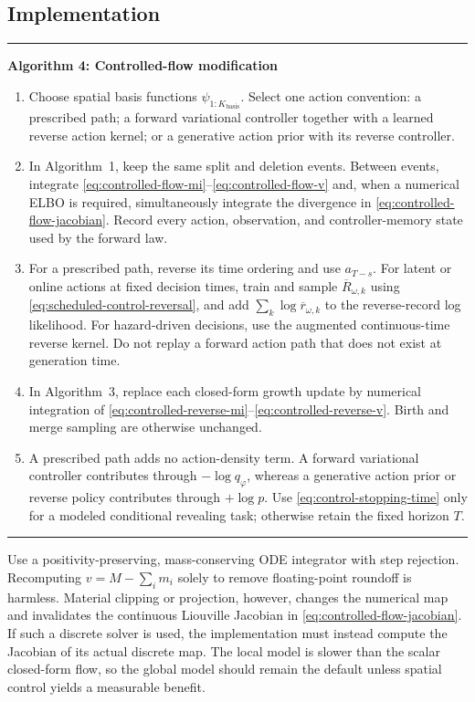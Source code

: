 \documentclass[10pt]{article}
\theoremstyle{definition}
\theoremstyle{remark}
\newenvironment{algorithmblock}[1]
{\par\medskip\noindent\begin{minipage}{\linewidth}\hrule\medskip
 \noindent\textbf{#1}\par\smallskip\small}
{\par\medskip\hrule\end{minipage}\par\medskip}
\begin{document}
\subsection{Implementation}

\begin{algorithmblock}{Algorithm 4: Controlled-flow modification}
\begin{enumerate}
  \item Choose spatial basis functions
  $\psi_{1:K_{\mathrm{basis}}}$.  Select one action convention: a prescribed
  path; a forward variational controller together with a learned reverse
  action kernel; or a generative action prior with its reverse controller.
  \item In Algorithm~1, keep the same split and deletion events.  Between
  events, integrate \eqref{eq:controlled-flow-mi}--\eqref{eq:controlled-flow-v}
  and, when a numerical ELBO is required, simultaneously integrate the
  divergence in \eqref{eq:controlled-flow-jacobian}.  Record every action,
  observation, and controller-memory state used by the forward law.
  \item For a prescribed path, reverse its time ordering and use $a_{T-s}$.
  For latent or online actions at fixed decision times, train and sample
  $\overline R_{\omega,k}$ using
  \eqref{eq:scheduled-control-reversal}, and add
  $\sum_k\log\overline r_{\omega,k}$ to the reverse-record log likelihood.
  For hazard-driven decisions, use the augmented continuous-time reverse
  kernel.  Do not replay a forward action path that does not exist at
  generation time.
  \item In Algorithm~3, replace each closed-form growth update by numerical
  integration of
  \eqref{eq:controlled-reverse-mi}--\eqref{eq:controlled-reverse-v}.
  Birth and merge sampling are otherwise unchanged.
  \item A prescribed path adds no action-density term.  A forward variational
  controller contributes through $-\log q_\varphi$, whereas a generative
  action prior or reverse policy contributes through $+\log p$.  Use
  \eqref{eq:control-stopping-time} only for a modeled conditional revealing
  task; otherwise retain the fixed horizon $T$.
\end{enumerate}
\end{algorithmblock}

Use a positivity-preserving, mass-conserving ODE integrator with step
rejection.  Recomputing $v=M-\sum_i m_i$ solely to remove floating-point
roundoff is harmless.  Material clipping or projection, however, changes the
numerical map and invalidates the continuous Liouville Jacobian in
\eqref{eq:controlled-flow-jacobian}.  If such a discrete solver is used, the
implementation must instead compute the Jacobian of its actual discrete map.
The local model is slower than the scalar closed-form flow, so the global
model should remain the default unless spatial control yields a measurable
benefit.
\end{document}
